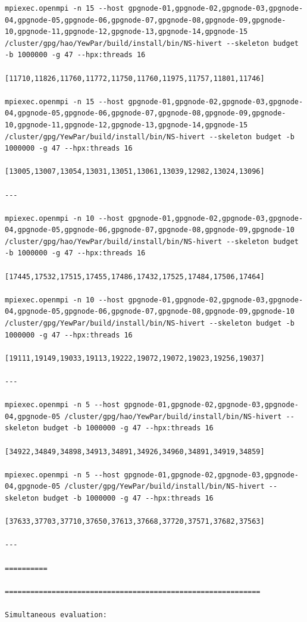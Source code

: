 \documentclass{mproj}
\begin{document}
\begin{lstlisting}
mpiexec.openmpi -n 15 --host gpgnode-01,gpgnode-02,gpgnode-03,gpgnode-04,gpgnode-05,gpgnode-06,gpgnode-07,gpgnode-08,gpgnode-09,gpgnode-10,gpgnode-11,gpgnode-12,gpgnode-13,gpgnode-14,gpgnode-15 /cluster/gpg/hao/YewPar/build/install/bin/NS-hivert --skeleton budget -b 1000000 -g 47 --hpx:threads 16

[11710,11826,11760,11772,11750,11760,11975,11757,11801,11746]

mpiexec.openmpi -n 15 --host gpgnode-01,gpgnode-02,gpgnode-03,gpgnode-04,gpgnode-05,gpgnode-06,gpgnode-07,gpgnode-08,gpgnode-09,gpgnode-10,gpgnode-11,gpgnode-12,gpgnode-13,gpgnode-14,gpgnode-15 /cluster/gpg/YewPar/build/install/bin/NS-hivert --skeleton budget -b 1000000 -g 47 --hpx:threads 16

[13005,13007,13054,13031,13051,13061,13039,12982,13024,13096]

---

mpiexec.openmpi -n 10 --host gpgnode-01,gpgnode-02,gpgnode-03,gpgnode-04,gpgnode-05,gpgnode-06,gpgnode-07,gpgnode-08,gpgnode-09,gpgnode-10 /cluster/gpg/hao/YewPar/build/install/bin/NS-hivert --skeleton budget -b 1000000 -g 47 --hpx:threads 16

[17445,17532,17515,17455,17486,17432,17525,17484,17506,17464]

mpiexec.openmpi -n 10 --host gpgnode-01,gpgnode-02,gpgnode-03,gpgnode-04,gpgnode-05,gpgnode-06,gpgnode-07,gpgnode-08,gpgnode-09,gpgnode-10 /cluster/gpg/YewPar/build/install/bin/NS-hivert --skeleton budget -b 1000000 -g 47 --hpx:threads 16

[19111,19149,19033,19113,19222,19072,19072,19023,19256,19037]

---

mpiexec.openmpi -n 5 --host gpgnode-01,gpgnode-02,gpgnode-03,gpgnode-04,gpgnode-05 /cluster/gpg/hao/YewPar/build/install/bin/NS-hivert --skeleton budget -b 1000000 -g 47 --hpx:threads 16

[34922,34849,34898,34913,34891,34926,34960,34891,34919,34859]

mpiexec.openmpi -n 5 --host gpgnode-01,gpgnode-02,gpgnode-03,gpgnode-04,gpgnode-05 /cluster/gpg/YewPar/build/install/bin/NS-hivert --skeleton budget -b 1000000 -g 47 --hpx:threads 16

[37633,37703,37710,37650,37613,37668,37720,37571,37682,37563]

---

==========

============================================================

Simultaneous evaluation:


\end{lstlisting}
\end{document}
